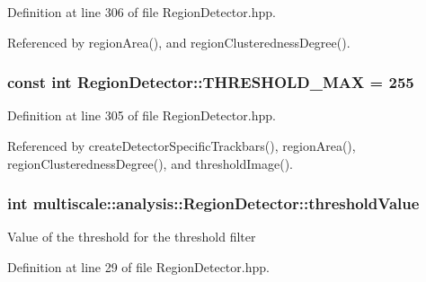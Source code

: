 \-Definition at line 306 of file \-Region\-Detector.\-hpp.



\-Referenced by region\-Area(), and region\-Clusteredness\-Degree().

\hypertarget{classmultiscale_1_1analysis_1_1RegionDetector_a53c6e2b067a8b8c82484cbca34cc3d57}{
\subsubsection[{\-T\-H\-R\-E\-S\-H\-O\-L\-D\-\_\-\-M\-A\-X}]{\setlength{\rightskip}{0pt plus 5cm}const int {\bf \-Region\-Detector\-::\-T\-H\-R\-E\-S\-H\-O\-L\-D\-\_\-\-M\-A\-X} = 255}}\label{classmultiscale_1_1analysis_1_1RegionDetector_a53c6e2b067a8b8c82484cbca34cc3d57}


\-Definition at line 305 of file \-Region\-Detector.\-hpp.



\-Referenced by create\-Detector\-Specific\-Trackbars(), region\-Area(), region\-Clusteredness\-Degree(), and threshold\-Image().

\hypertarget{classmultiscale_1_1analysis_1_1RegionDetector_a0f7469d124c0b906d199e00ea5713007}{
\subsubsection[{threshold\-Value}]{\setlength{\rightskip}{0pt plus 5cm}int {\bf multiscale\-::analysis\-::\-Region\-Detector\-::threshold\-Value}}}\label{classmultiscale_1_1analysis_1_1RegionDetector_a0f7469d124c0b906d199e00ea5713007}
\-Value of the threshold for the threshold filter 

\-Definition at line 29 of file \-Region\-Detector.\-hpp.



